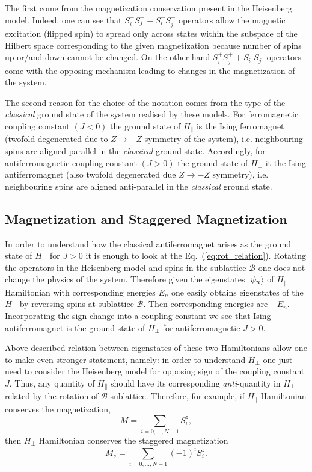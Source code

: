 \documentclass[12pt, a4paper]{article}
\begin{document}
The first come from the magnetization conservation present in the Heisenberg model. Indeed, one can see that $S_i^+ S_j^- + S_i^- S_j^+$ operators allow the magnetic excitation (flipped spin) to spread only across states within the subspace of the Hilbert space corresponding to the given magnetization because number of spins up or/and down cannot be changed. On the other hand $S_i^+ S_j^+ + S_i^- S_j^-$ operators come with the opposing mechanism leading to changes in the magnetization of the system. 

The second reason for the choice of the notation comes from the type of the \textit{classical} ground state of the system realised by these models. For ferromagnetic coupling constant $(J < 0)$ the ground state of $H_{\parallel}$ is the Ising ferromagnet (twofold degenerated due to $Z \to -Z$ symmetry of the system), i.e. neighbouring spins are aligned parallel in the \textit{classical} ground state. Accordingly, for antiferromagnetic coupling constant $(J > 0)$ the ground state of $H_{\perp}$ it the Ising antiferromagnet (also twofold degenerated due $Z \to -Z$ symmetry), i.e. neighbouring spins are aligned anti-parallel in the \textit{classical} ground state.

\subsection{Magnetization and Staggered Magnetization}
In order to understand how the classical antiferromagnet arises as the ground state of $H_{\perp}$ for $J > 0$ it is enough to look at the Eq.~(\ref{eq:rot_relation}). Rotating the operators in the Heisenberg model and spins in the sublattice $\mathcal{B}$ one does not change the physics of the system. Therefore given the eigenstates $\ket{\psi_n}$ of $H_{\parallel}$ Hamiltonian with corresponding energies $E_n$ one easily obtains eigenstates of the $H_{\perp}$ by reversing spins at sublattice $\mathcal{B}$. Then corresponding energies are $-E_n$. Incorporating the sign change into a coupling constant we see that Ising antiferromagnet is the ground state of $H_{\perp}$ for antiferromagnetic $J > 0$. 

Above-described relation between eigenstates of these two Hamiltonians allow one to make even stronger statement, namely: in order to understand $H_{\perp}$ one just need to consider the Heisenberg model for opposing sign of the coupling constant $J$. Thus, any quantity of $H_{\parallel}$ should have its corresponding \textit{anti}-quantity in $H_{\perp}$ related by the rotation of $\mathcal{B}$ sublattice. Therefore, for example, if $H_{\parallel}$ Hamiltonian conserves the magnetization,
\begin{equation}
M = \sum_{i = 0,\hdots,N-1} S_i^z,
\end{equation}
then $H_{\perp}$ Hamiltonian conserves the staggered magnetization
\begin{equation}
M_s = \sum_{i = 0,\hdots,N-1} (-1)^i S_i^z.
\end{equation}
\end{document}
